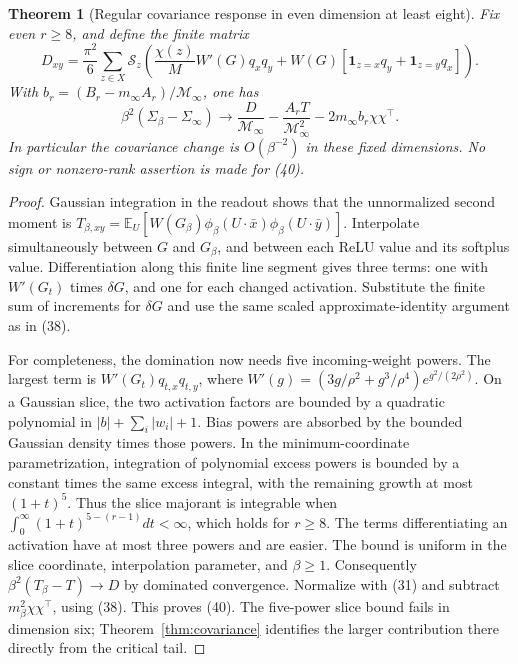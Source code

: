 \documentclass[11pt]{article}
\newtheorem{theorem}{Theorem}\newtheorem{lemma}[theorem]{Lemma}
\newcommand{\E}{\mathbb E}\newcommand{\R}{\mathbb R}
\newcommand{\one}{\mathbf1}
\begin{document}
\begin{theorem}[Regular covariance response in even dimension at least eight]
Fix even $r\ge8$, and define the finite matrix
\[
 D_{xy}=\frac{\pi^2}{6}\sum_{z\in X}\mathcal S_z\left(
   \frac{\chi(z)}M W'(G)q_xq_y
       +W(G)[\one_{z=x}q_y+\one_{z=y}q_x]\right).        \tag{39}
\]
With $b_r=(B_r-m_\infty A_r)/\mathcal M_\infty$, one has
\[
 \beta^2(\Sigma_\beta-\Sigma_\infty)
 \longrightarrow \frac{D}{\mathcal M_\infty}
          -\frac{A_r T}{\mathcal M_\infty^2}
          -2m_\infty b_r\chi\chi^\top.                \tag{40}
\]
In particular the covariance change is $O(\beta^{-2})$ in these
fixed dimensions. No sign or nonzero-rank assertion is made for (40).
\end{theorem}
\begin{proof}
Gaussian integration in the readout shows that the unnormalized
second moment is
$T_{\beta,xy}=\E_U[W(G_\beta)\phi_\beta(U\cdot\bar x)
                                      \phi_\beta(U\cdot\bar y)]$.
Interpolate simultaneously between $G$ and $G_\beta$, and between
each ReLU value and its softplus value. Differentiation along this
finite line segment gives three terms: one with $W'(G_t)$ times
$\delta G$, and one for each changed activation. Substitute the
finite sum of increments for $\delta G$ and use the same scaled
approximate-identity argument as in (38).

For completeness, the domination now needs five incoming-weight
powers. The largest term is $W'(G_t)q_{t,x}q_{t,y}$, where
$W'(g)=(3g/\rho^2+g^3/\rho^4)e^{g^2/(2\rho^2)}$.
On a Gaussian slice, the two activation factors are bounded by a
quadratic polynomial in $|b|+\sum_i|w_i|+1$. Bias powers are absorbed
by the bounded Gaussian density times those powers. In the
minimum-coordinate parametrization, integration of polynomial excess
powers is bounded by a constant times the same excess integral,
with the remaining growth at most $(1+t)^5$. Thus the slice majorant
is integrable when
$\int_0^\infty(1+t)^{5-(r-1)}dt<\infty$, which holds for $r\ge8$.
The terms differentiating an activation have at most three powers
and are easier. The bound is uniform in the slice coordinate,
interpolation parameter, and $\beta\ge1$.
Consequently $\beta^2(T_\beta-T)\to D$ by dominated convergence.
Normalize with (31) and subtract
$m_\beta^2\chi\chi^\top$, using (38). This proves (40).
The five-power slice bound fails in dimension six; Theorem~\ref{thm:covariance}
identifies the larger contribution there directly from the critical tail.
\end{proof}
\end{document}
